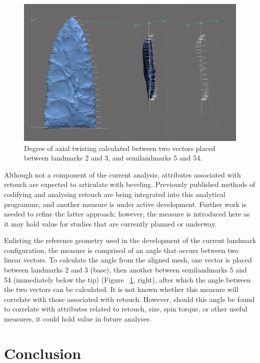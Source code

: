 \documentclass[review]{elsarticle}
\begin{document}
\begin{figure}[h]\centering
\includegraphics[width=\linewidth]{fig16.pdf}
\caption{Degree of axial twisting calculated between two vectors placed between landmarks 2 and 3, and semilandmarks 5 and 54.}
\label{fig:fig16}
\end{figure}

Although not a component of the current analysis, attributes associated with retouch are expected to articulate with beveling. Previously published methods of codifying and analysing retouch \citep{RN4308,RN3854} are being integrated into this analytical programme, and another measure is under active development. Further work is needed to refine the latter approach; however, the measure is introduced here as it may hold value for studies that are currently planned or underway.

Enlisting the reference geometry used in the development of the current landmark configuration, the measure is comprised of an angle that occurs between two linear vectors. To calculate the angle from the aligned mesh, one vector is placed between landmarks 2 and 3 (base), then another between semilandmarks 5 and 54 (immediately below the tip) (Figure ~\ref{fig:fig16}, right), after which the angle between the two vectors can be calculated. It is not known whether this measure will correlate with those associated with retouch. However, should this angle be found to correlate with attributes related to retouch, size, spin torque, or other useful measures, it could hold value in future analyses.

\section*{Conclusion}
\end{document}
